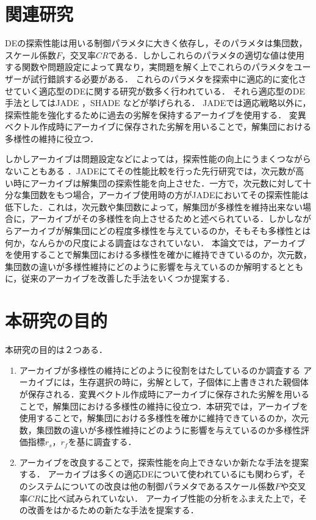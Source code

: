 \documentclass[a4paper,11pt,oneside,openany]{jsbook}
\begin{document}
\section{関連研究}
DEの探索性能は用いる制御パラメタに大きく依存し，そのパラメタは集団数，スケール係数$F$，交叉率$CR$である．しかしこれらのパラメタの適切な値は使用する関数や問題設定によって異なり，実問題を解く上でこれらのパラメタをユーザーが試行錯誤する必要がある．
これらのパラメタを探索中に適応的に変化させていく適応型のDEに関する研究が数多く行われている．
それら適応型のDE手法としてはJADE \cite{JADE} ，SHADE \cite{SHADE} などが挙げられる．
JADEでは適応戦略以外に，探索性能を強化するために過去の劣解を保持するアーカイブを使用する．
変異ベクトル作成時にアーカイブに保存された劣解を用いることで，解集団における多様性の維持に役立つ．

しかしアーカイブは問題設定などによっては，探索性能の向上にうまくつながらないこともある \cite{JADE} ．JADEにてその性能比較を行った先行研究では，次元数が高い時にアーカイブは解集団の探索性能を向上させた．一方で，次元数に対して十分な集団数をもつ場合，アーカイブ使用時の方がJADEにおいてその探索性能は低下した．これは，次元数や集団数によって，解集団が多様性を維持出来ない場合に，アーカイブがその多様性を向上させるためと述べられている．しかしながらアーカイブが解集団にどの程度多様性を与えているのか，そもそも多様性とは何か，なんらかの尺度による調査はなされていない．
本論文では，アーカイブを使用することで解集団における多様性を確かに維持できているのか，次元数，集団数の違いが多様性維持にどのように影響を与えているのか解明するとともに，従来のアーカイブを改善した手法をいくつか提案する．

\section{本研究の目的}
本研究の目的は２つある．
\begin{enumerate}
\item アーカイブが多様性の維持にどのように役割をはたしているのか調査する
\vspace{3mm}
\newline
アーカイブには，生存選択の時に，劣解として，子個体に上書きされた親個体が保存される．変異ベクトル作成時にアーカイブに保存された劣解を用いることで，解集団における多様性の維持に役立つ．本研究では，アーカイブを使用することで，解集団における多様性を確かに維持できているのか，次元数，集団数の違いが多様性維持にどのように影響を与えているのか多様性評価指標$r_s$，$r_f$を基に調査する．
\newline


\item アーカイブを改良することで，探索性能を向上できないか新たな手法を提案する．
\vspace{3mm}
\newline
アーカイブは多くの適応DEについて使われているにも関わらず，そのシステムについての改良は他の制御パラメタであるスケール係数$F$や交叉率$CR$に比べ試みられていない．
アーカイブ性能の分析をふまえた上で，その改善をはかるための新たな手法を提案する．
\end{enumerate}
\end{document}

